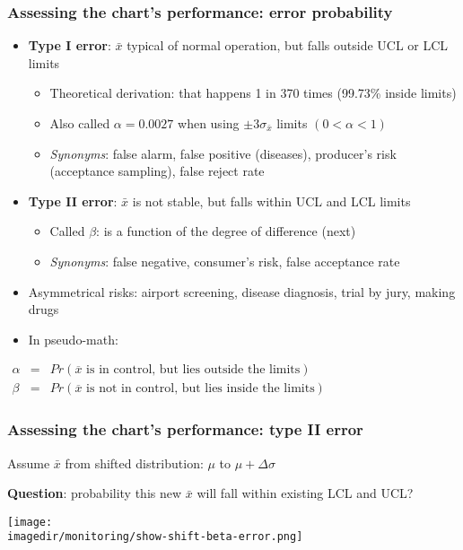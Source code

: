 \begin{frame}\frametitle{Assessing the chart's performance: error probability}
	\begin{itemize}
		\item	\textbf{Type I error}: $\bar{x}$ typical of normal operation, but falls outside UCL or LCL limits 
		\begin{itemize}
			\item	Theoretical derivation: that happens 1 in 370 times (99.73\% inside limits) 
			\item	Also called $\alpha = 0.0027$ when using $\pm 3 \sigma_{\bar{x}}$ limits $(0 <\alpha < 1)$ 
			\item	\emph{Synonyms}: false alarm, false positive (diseases), producer's risk (acceptance sampling), false reject rate 
		\end{itemize}
	\end{itemize}
	\begin{itemize}
		\item	\textbf{Type II error}: $\bar{x}$ is not stable, but falls within UCL and LCL limits 
		\begin{itemize}
			\item	Called $\beta$: is a function of the degree of difference (next) 
			\item	\emph{Synonyms}: false negative, consumer's risk, false acceptance rate 
		\end{itemize}
	\end{itemize}
	\begin{itemize}
		\item	Asymmetrical risks: airport screening, disease diagnosis, trial by jury, making drugs 
	\end{itemize}
	\begin{itemize}
		\item	In pseudo-math: 
	\end{itemize}
	$ 
	\begin{array}{rcl}
		\alpha &=& Pr\left(\overline{x}\,\,\text{is in control, but lies outside the limits}\right)\\
		\beta &=& Pr\left(\overline{x}\,\,\text{is not in control, but lies inside the limits}\right) 
	\end{array}
	$
\end{frame}

\begin{frame}\frametitle{Assessing the chart's performance: type II error}
	
	Assume $\bar{x}$ from shifted distribution: $\mu$ to $\mu + \Delta\sigma$
	
	\textbf{Question}: probability this new $\bar{x}$ will fall within existing LCL and UCL?
	
	\texttt{[image: \\imagedir/monitoring/show-shift-beta-error.png]}
\end{frame}

